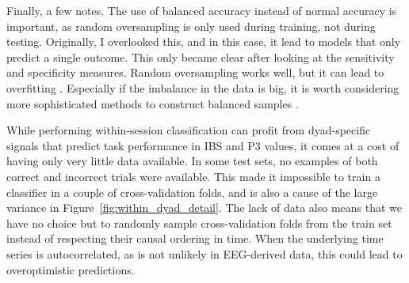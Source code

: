 Finally, a few notes. The use of balanced accuracy instead of normal accuracy is
important, as random oversampling is only used during training, not during
testing. Originally, I overlooked this, and in this case, it lead to models that
only predict a single outcome. This only became clear after looking at the
sensitivity and specificity measures. Random oversampling works well, but it can
lead to overfitting \parencite{maimon_data_2005}. Especially if the imbalance in
the data is big, it is worth considering more sophisticated methods to construct
balanced samples \parencite[][e.g. SMOTE]{maimon_data_2005}.

While performing within-session classification can profit from dyad-specific
signals that predict task performance in IBS and P3 values, it comes at a cost
of having only very little data available. In some test sets, no examples of
both correct and incorrect trials were available. This made it impossible to
train a classifier in a couple of cross-validation folds, and is also a cause of
the large variance in Figure~\ref{fig:within_dyad_detail}. The lack of data also
means that we have no choice but to randomly sample cross-validation folds from
the train set instead of respecting their causal ordering in time. When the
underlying time series is autocorrelated, as is not unlikely in EEG-derived
data, this could lead to overoptimistic predictions.
